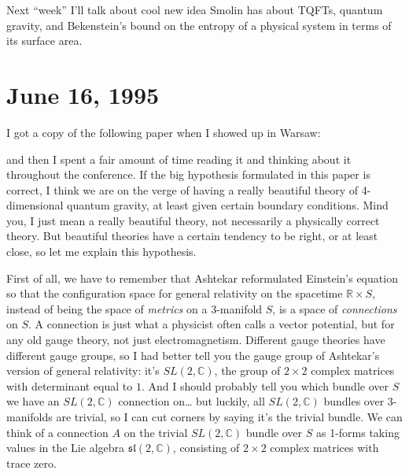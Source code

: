 \documentclass{article}
\def\tightlist{}
\renewcommand{\texttt}[1]{%
  \begingroup
  \ttfamily
  \begingroup\lccode`~=`/\lowercase{\endgroup\def~}{/\discretionary{}{}{}}%
  \begingroup\lccode`~=`[\lowercase{\endgroup\def~}{[\discretionary{}{}{}}%
  \begingroup\lccode`~=`.\lowercase{\endgroup\def~}{.\discretionary{}{}{}}%
  \catcode`/=\active\catcode`[=\active\catcode`.=\active
  \scantokens{#1\noexpand}%
  \endgroup
}
\begin{document}
Next ``week'' I'll talk about cool new idea Smolin has about TQFTs,
quantum gravity, and Bekenstein's bound on the entropy of a physical
system in terms of its surface area.
\hypertarget{week56}{%
\section{June 16, 1995}\label{week56}}

I got a copy of the following paper when I showed up in Warsaw:


and then I spent a fair amount of time reading it and thinking about it
throughout the conference. If the big hypothesis formulated in this
paper is correct, I think we are on the verge of having a really
beautiful theory of 4-dimensional quantum gravity, at least given
certain boundary conditions. Mind you, I just mean a really beautiful
theory, not necessarily a physically correct theory. But beautiful
theories have a certain tendency to be right, or at least close, so let
me explain this hypothesis.

First of all, we have to remember that Ashtekar reformulated Einstein's
equation so that the configuration space for general relativity on the
spacetime \(\mathbb{R}\times S\), instead of being the space of
\emph{metrics} on a 3-manifold \(S\), is a space of \emph{connections}
on \(S\). A connection is just what a physicist often calls a vector
potential, but for any old gauge theory, not just electromagnetism.
Different gauge theories have different gauge groups, so I had better
tell you the gauge group of Ashtekar's version of general relativity:
it's \(SL(2,\mathbb{C})\), the group of \(2\times2\) complex matrices
with determinant equal to \(1\). And I should probably tell you which
bundle over \(S\) we have an \(SL(2,\mathbb{C})\) connection on\ldots{}
but luckily, all \(SL(2,\mathbb{C})\) bundles over 3-manifolds are
trivial, so I can cut corners by saying it's the trivial bundle. We can
think of a connection \(A\) on the trivial \(SL(2,\mathbb{C})\) bundle
over \(S\) as 1-forms taking values in the Lie algebra
\(\mathfrak{sl}(2,\mathbb{C})\), consisting of \(2\times2\) complex
matrices with trace zero.
\end{document}
